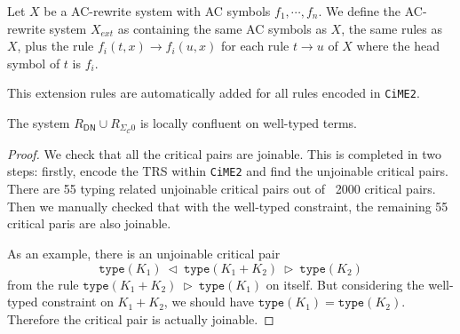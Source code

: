 \documentclass[manuscript, review, timestamp]{acmart}
\newcommand*{\type}{\texttt{type}}
\newcommand*{\reduce}{\ \triangleright\ }
\newcommand*{\reducefrom}{\ \triangleleft\ }
\begin{document}
\begin{definition}
  Let $X$ be a AC-rewrite system with AC symbols $f_1, \cdots, f_n$. We define the AC-rewrite system $X_{ext}$ as containing the same AC symbols as $X$, the same rules as $X$, plus the rule $f_i(t, x) \to f_i(u, x)$ for each rule $t \to u$ of $X$ where the head symbol of $t$ is $f_i$.
\end{definition}

This extension rules are automatically added for all rules encoded in \texttt{CiME2}.

\begin{lemma}
  \label{lemma: CiME2 conf}
  The system $R_\textsf{DN} \cup R_{\Sigma_\mathcal{C}0}$ is locally confluent on well-typed terms.
\end{lemma}
\begin{proof}
  We check that all the critical pairs are joinable. This is completed in two steps: firstly, encode the TRS within \texttt{CiME2} and find the unjoinable critical pairs. There are 55 typing related unjoinable critical pairs out of ~2000 critical pairs. Then we manually checked that with the well-typed constraint, the remaining 55 critical paris are also joinable. 
  
  As an example, there is an unjoinable critical pair
  $$
    \type(K_1) \reducefrom \type(K_1 + K_2) \reduce \type(K_2)
  $$
  from the rule $\type(K_1 + K_2) \reduce \type(K_1)$ on itself. But considering the well-typed constraint on $K_1 + K_2$, we should have $\type(K_1) = \type(K_2)$. Therefore the critical pair is actually joinable.
\end{proof}





\end{document}
